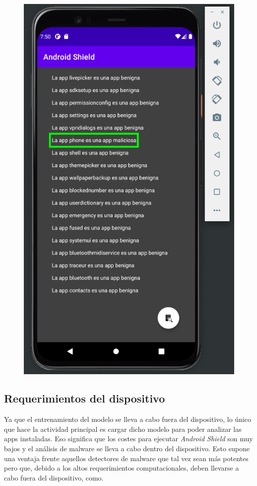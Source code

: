 \begin{figure}[H]
\begin{minipage}{.5\textwidth}
	\includegraphics[scale=0.3]{img/test.png}
	\label{fig:prueba}
\end{minipage}
\end{figure}

\subsection{Requerimientos del dispositivo}

Ya que el entrenamiento del modelo se lleva a cabo fuera del dispositivo, lo único que hace la actividad principal es cargar dicho modelo para poder analizar las apps instaladas. Eso significa que los costes para ejecutar \textit{Android Shield} son muy bajos y el análisis de malware se lleva a cabo dentro del dispositivo. Esto supone una ventaja frente aquellos detectores de malware que tal vez sean más potentes pero que, debido a los altos requerimientos computacionales, deben llevarse a cabo fuera del dispositivo, como\hypersetup{citecolor=red}\cite{cloud}.

